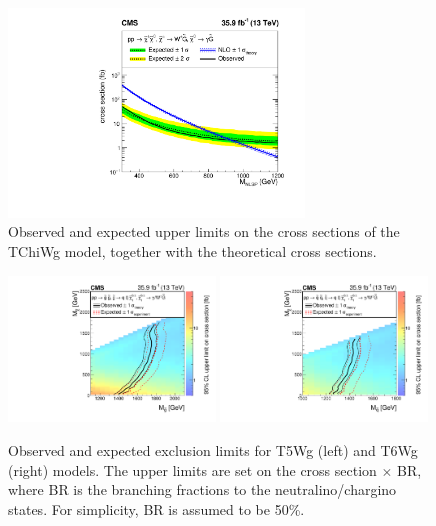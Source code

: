 \documentclass[thesis.tex]{subfiles}
\renewcommand\_{\textunderscore\allowbreak}
\begin{document}
\begin{figure}
  \centering
    \includegraphics[width=0.7\textwidth]{Fig/Figure_006.pdf}
		\caption{Observed and expected upper limits on the cross sections of the TChiWg model, together with the theoretical cross sections. }
    \label{fig:tchiwglimit}
\end{figure}

\begin{figure}
  \centering
    \includegraphics[width=0.49\textwidth]{Fig/Figure_007-a.pdf}
    \includegraphics[width=0.49\textwidth]{Fig/Figure_007-b.pdf}
		\caption{Observed and expected exclusion limits for T5Wg (left) and T6Wg (right) models. The upper limits are set on the cross section $\times$ BR, where BR is the branching fractions to the neutralino/chargino states. For simplicity, BR is assumed to be 50\%. }
    \label{fig:t5wglimit}
\end{figure}
\end{document}
